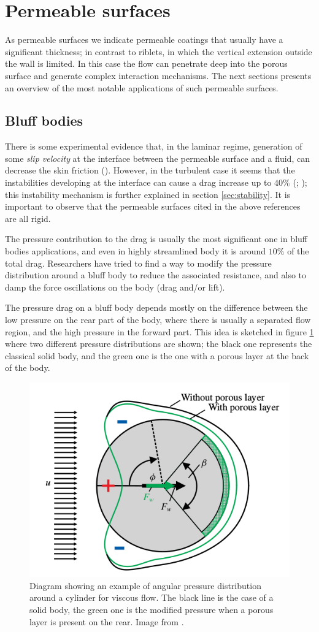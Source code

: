 \section{Permeable surfaces}
As permeable surfaces we indicate permeable coatings that usually have a significant thickness; in contrast to riblets, in which the vertical extension outside the wall is limited.
In this case the flow can penetrate deep into the porous surface and generate complex interaction mechanisms.
The next sections presents an overview of the most notable applications of such permeable surfaces.

\subsection{Bluff bodies}

There is some experimental evidence that, in the laminar regime, generation of some \textit{slip velocity} at the interface between the permeable surface and a fluid, can decrease the skin friction (\citet{beaver}).
However, in the turbulent case it seems that the instabilities developing at the interface can cause a drag increase up to $40\%$ (\citet{jimenez2001turbulent}; \citet{breugem2006influence}); this instability mechanism is further explained in section \ref{sec:stability}.
It is important to observe that the permeable surfaces cited in the above references are all rigid.

The pressure contribution to the drag is usually the most significant one in bluff bodies applications, and even in highly streamlined body it is around $10\%$ of the total drag.
Researchers have tried to find a way to modify the pressure distribution around a bluff body to reduce the associated resistance, and also to damp the force oscillations on the body (drag and/or lift).

The pressure drag on a bluff body depends mostly on the difference between the low pressure on the rear part of the body, where there is usually a separated flow region, and the high pressure in the forward part.
This idea is sketched in figure \ref{fig:pressure_dist} where two different pressure distributions are shown; the black one represents the classical solid body, and the green one is the one with a porous layer at the back of the body.

\begin{figure}[h]
	\centering
	\includegraphics[width=0.4\linewidth]{chapter_1/pressure_dist}
	\caption{Diagram showing an example of angular pressure distribution around a cylinder for viscous flow. The black line is the case of a solid body, the green one is the modified pressure when a porous layer is present on the rear. Image from \citet{klausmann2017drag}.}
	\label{fig:pressure_dist}
\end{figure}

